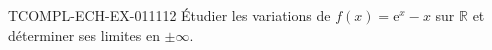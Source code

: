 \begin{exercice}{TCOMPL-ECH-EX-011}{1}{12}
Étudier les variations de $f(x) = \mathrm{e}^x - x$ sur $\mathbb{R}$ et déterminer ses limites en $\pm\infty$.

\end{exercice}
